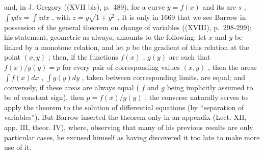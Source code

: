 and, in J. Gregory ((XVII bis), p.~489), for a curve \(y = f(x)\) and its arc \(s\) , \(\int y ds = \int z dx\) , with \(z = y\sqrt{1 + y^2}\) . It is only in 1669 that we see Barrow in possession of the general theorem on change of variables ((XVIII), p.~298-299); his statement, geometric as always, amounts to the following: let \(x\) and \(y\) be linked by a monotone relation, and let \(p\) be the gradient of this relation at the point \((x, y)\) ; then, if the functions \(f(x)\) , \(g(y)\) are such that \(f(x)/g(y) = p\) for every pair of corresponding values \((x, y)\) , then the areas \(\int f(x) dx\) , \(\int g(y) dy\) , taken between corresponding limits, are equal; and conversely, if these areas are always equal ( \(f\) and \(g\) being implicitly assumed to be of constant sign), then \(p = f(x)/g(y)\) ; the converse naturally serves to apply the theorem to the solution of differential equations (by ``separation of variables''). But Barrow inserted the theorem only in an appendix (Lect. XII, app. III, theor. IV), where, observing that many of his previous results are only particular cases, he excused himself as having discovered it too late to make more use of it.

